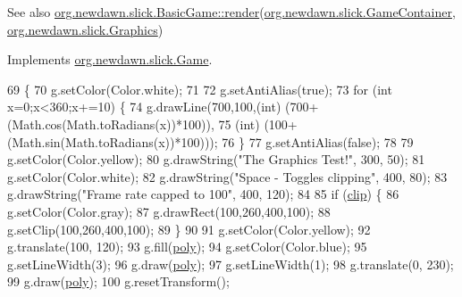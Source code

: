 \begin{DoxySeeAlso}{See also}
\mbox{\hyperlink{interfaceorg_1_1newdawn_1_1slick_1_1_game_af1a4670d43eb3ba04dfcf55ab1975b64}{org.\+newdawn.\+slick.\+Basic\+Game\+::render}}(\mbox{\hyperlink{classorg_1_1newdawn_1_1slick_1_1_game_container}{org.\+newdawn.\+slick.\+Game\+Container}}, \mbox{\hyperlink{classorg_1_1newdawn_1_1slick_1_1_graphics}{org.\+newdawn.\+slick.\+Graphics}}) 
\end{DoxySeeAlso}


Implements \mbox{\hyperlink{interfaceorg_1_1newdawn_1_1slick_1_1_game_af1a4670d43eb3ba04dfcf55ab1975b64}{org.\+newdawn.\+slick.\+Game}}.


\begin{DoxyCode}
69                                                                                   \{
70         g.setColor(Color.white);
71         
72         g.setAntiAlias(\textcolor{keyword}{true});
73         \textcolor{keywordflow}{for} (\textcolor{keywordtype}{int} x=0;x<360;x+=10) \{
74             g.drawLine(700,100,(\textcolor{keywordtype}{int}) (700+(Math.cos(Math.toRadians(x))*100)),
75                                (\textcolor{keywordtype}{int}) (100+(Math.sin(Math.toRadians(x))*100)));
76         \}
77         g.setAntiAlias(\textcolor{keyword}{false});
78         
79         g.setColor(Color.yellow);
80         g.drawString(\textcolor{stringliteral}{"The Graphics Test!"}, 300, 50);
81         g.setColor(Color.white);
82         g.drawString(\textcolor{stringliteral}{"Space - Toggles clipping"}, 400, 80);
83         g.drawString(\textcolor{stringliteral}{"Frame rate capped to 100"}, 400, 120);
84         
85         \textcolor{keywordflow}{if} (\mbox{\hyperlink{classorg_1_1newdawn_1_1slick_1_1tests_1_1_graphics_test_a45883b25988c6ce31f644d342ab168f3}{clip}}) \{
86             g.setColor(Color.gray);
87             g.drawRect(100,260,400,100);
88             g.setClip(100,260,400,100);
89         \}
90 
91         g.setColor(Color.yellow);
92         g.translate(100, 120);
93         g.fill(\mbox{\hyperlink{classorg_1_1newdawn_1_1slick_1_1tests_1_1_graphics_test_a3427e7e0650177a34f0a1df767f15720}{poly}});
94         g.setColor(Color.blue);
95         g.setLineWidth(3);
96         g.draw(\mbox{\hyperlink{classorg_1_1newdawn_1_1slick_1_1tests_1_1_graphics_test_a3427e7e0650177a34f0a1df767f15720}{poly}});
97         g.setLineWidth(1);
98         g.translate(0, 230);
99         g.draw(\mbox{\hyperlink{classorg_1_1newdawn_1_1slick_1_1tests_1_1_graphics_test_a3427e7e0650177a34f0a1df767f15720}{poly}});
100         g.resetTransform();

\end{DoxyCode}
